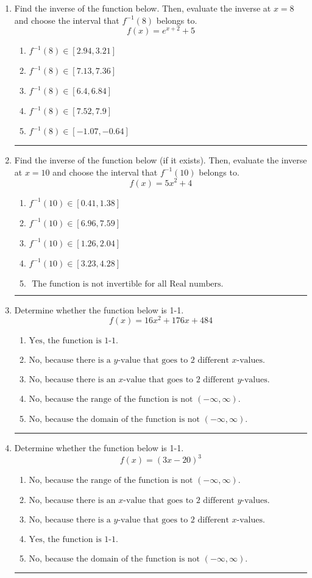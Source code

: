 \documentclass[14pt]{extbook}
\newcommand{\litem}[1]{\item#1\hspace*{-1cm}\rule{\textwidth}{0.4pt}}
\begin{document}
\begin{enumerate}
{\begin{enumerate}[label=\Alph*.]
\end{enumerate} }
\litem{
Find the inverse of the function below. Then, evaluate the inverse at $x = 8$ and choose the interval that $f^{-1}(8)$ belongs to.\[ f(x) = e^{x+2}+5 \]\begin{enumerate}[label=\Alph*.]
\item \( f^{-1}(8) \in [2.94, 3.21] \)
\item \( f^{-1}(8) \in [7.13, 7.36] \)
\item \( f^{-1}(8) \in [6.4, 6.84] \)
\item \( f^{-1}(8) \in [7.52, 7.9] \)
\item \( f^{-1}(8) \in [-1.07, -0.64] \)

\end{enumerate} }
\litem{
Find the inverse of the function below (if it exists). Then, evaluate the inverse at $x = 10$ and choose the interval that $f^{-1}(10)$ belongs to.\[ f(x) = 5 x^2 + 4 \]\begin{enumerate}[label=\Alph*.]
\item \( f^{-1}(10) \in [0.41, 1.38] \)
\item \( f^{-1}(10) \in [6.96, 7.59] \)
\item \( f^{-1}(10) \in [1.26, 2.04] \)
\item \( f^{-1}(10) \in [3.23, 4.28] \)
\item \( \text{ The function is not invertible for all Real numbers. } \)

\end{enumerate} }
\litem{
Determine whether the function below is 1-1.\[ f(x) = 16 x^2 + 176 x + 484 \]\begin{enumerate}[label=\Alph*.]
\item \( \text{Yes, the function is 1-1.} \)
\item \( \text{No, because there is a $y$-value that goes to 2 different $x$-values.} \)
\item \( \text{No, because there is an $x$-value that goes to 2 different $y$-values.} \)
\item \( \text{No, because the range of the function is not $(-\infty, \infty)$.} \)
\item \( \text{No, because the domain of the function is not $(-\infty, \infty)$.} \)

\end{enumerate} }
\litem{
Determine whether the function below is 1-1.\[ f(x) = (3 x - 20)^3 \]\begin{enumerate}[label=\Alph*.]
\item \( \text{No, because the range of the function is not $(-\infty, \infty)$.} \)
\item \( \text{No, because there is an $x$-value that goes to 2 different $y$-values.} \)
\item \( \text{No, because there is a $y$-value that goes to 2 different $x$-values.} \)
\item \( \text{Yes, the function is 1-1.} \)
\item \( \text{No, because the domain of the function is not $(-\infty, \infty)$.} \)

\end{enumerate} }
\end{enumerate}
\end{document}
